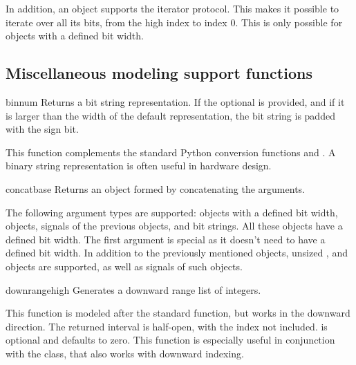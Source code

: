 In addition, an  object supports the iterator protocol. This
makes it possible to iterate over all its bits, from the high index to
index 0. This is only possible for  objects with a
defined bit width.



\subsection{Miscellaneous modeling support functions\label{ref-model-misc}}

\begin{funcdesc}{bin}{num }
Returns a bit string representation. If the optional 
is provided, and if it is larger than the width of the default
representation, the bit string is padded with the sign bit.

This function complements the standard Python conversion functions
 and . A binary string representation is often
useful in hardware design.
\end{funcdesc}

\begin{funcdesc}{concat}{base }
Returns an  object formed by concatenating the arguments.

The following argument types are supported:  objects with
a defined bit width,  objects, signals of the previous
objects, and bit strings. All these objects have a defined bit
width. The first argument  is special as it doesn't need to
have a defined bit width. In addition to the previously mentioned
objects, unsized ,  and  objects
are supported, as well as signals of such objects.
\end{funcdesc}

\begin{funcdesc}{downrange}{high }
Generates a downward range list of integers.

This function is modeled after the standard  function, but
works in the downward direction. The returned interval is half-open,
with the  index not included.  is optional and
defaults to zero.  This function is especially useful in conjunction
with the  class, that also works with downward indexing.
\end{funcdesc}

